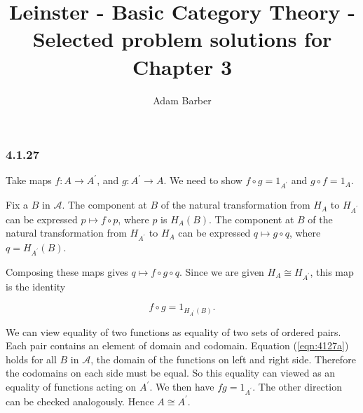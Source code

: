 \documentclass{article}
\begin{document}
\title{Leinster - Basic Category Theory - Selected problem solutions for Chapter 3}
\author{Adam Barber}

\maketitle

\subsubsection*{4.1.27}

Take maps $f: A \rightarrow A^\prime$, and $g: A^\prime \rightarrow A$. We need to show $f \circ g = 1_{A^\prime}$ and $g \circ f = 1_A$.

Fix a $B$ in $\mathcal{A}$. The component at $B$ of the natural transformation from $H_A$ to $H_{A^\prime}$  can be expressed $p \mapsto f \circ p$, where $p$ is $H_A(B)$. The component at $B$ of the natural transformation from $H_{A^\prime}$ to $H_A$ can be expressed $q \mapsto g \circ q$, where $q = H_{A^\prime}(B)$.

Composing these maps gives $q \mapsto f \circ g \circ q$. Since we are given $H_A \cong H_{A^\prime}$, this map is the identity

\begin{equation}
\label{eqn:4127a}
   f \circ g = 1_{H_{A^\prime}(B)}.
\end{equation}

We can view equality of two functions as equality of two sets of ordered pairs. Each pair contains an element of domain and codomain. Equation (\ref{eqn:4127a}) holds for all $B$ in $\mathcal{A}$, the domain of the functions on left and right side.  Therefore the codomains on each side must be equal. So this equality can viewed as an equality of functions acting on $A^\prime$. We then have $fg = 1_{A^\prime}$. The other direction can be checked analogously. Hence $A \cong A^\prime$.
\end{document}
